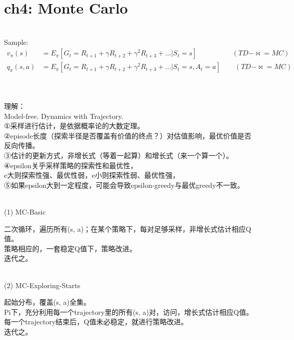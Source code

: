 \documentclass{article}
\begin{document}
\newpage
\section*{ch4: Monte Carlo}


~ \\[3pt]
Sample: 
\begin{align*}
    v_{\pi}(s) 
      &= E_{\pi} [ G_{t} = R_{t+1} + \gamma R_{t+2} + \gamma^2 R_{t+3} + ... | S_{t}=s ] 
         \qquad \qquad \quad (TD-\Join = MC) \\[3pt]
    q_{\pi}(s, a) 
      &= E_{\pi} [ G_{t} = R_{t+1} + \gamma R_{t+2} + \gamma^2 R_{t+3} + ... | S_{t}=s, A_{t}=a ] 
         \qquad (TD-\Join = MC) \\[3pt]
\end{align*}


~ \\[3pt]
\begin{CJK}{UTF8}{gbsn}
    理解： \\[3pt]
    Model-free. Dynamics with Trajectory. \\[3pt]
    ①采样进行估计，是依据概率论的大数定理。 \\[3pt]
    ②episode长度（探索半径是否覆盖有价值的终点？）对估值影响，最优价值是否反向传播。 \\[3pt]
    ③估计的更新方式，非增长式（等着一起算）和增长式（来一个算一个）。 \\[3pt]
    ④epsilon关乎采样策略的探索性和最优性， \\[3pt]
    e大则探索性强、最优性弱，e小则探索性弱、最优性强， \\[3pt]
    ⑤如果epsilon大到一定程度，可能会导致epsilon-greedy与最优greedy不一致。 \\[3pt]
\end{CJK}


~ \\[3pt]
(1) MC-Basic 
~ \\[3pt]
\begin{CJK}{UTF8}{gbsn}
    二次循环，遍历所有(s, a)；在某个策略下，每对足够采样，非增长式估计相应Q值。 \\[3pt]
    策略相应的，一套稳定Q值下，策略改进。 \\[3pt]
    迭代之。 \\[3pt]
\end{CJK}


~ \\[3pt]
(2) MC-Exploring-Starts 
~ \\[3pt]
\begin{CJK}{UTF8}{gbsn}
    起始分布，覆盖(s, a)全集。 \\[3pt]
    Pi下，充分利用每一个trajectory里的所有(s, a)对，访问，增长式估计相应Q值。 \\[3pt]
    每一个trajectory结束后，Q值未必稳定，就进行策略改进。 \\[3pt]
    迭代之。 \\[3pt]
\end{CJK}
\end{document}
